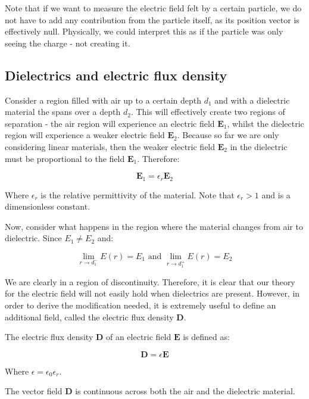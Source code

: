 \documentclass{article}
\begin{document}
Note that if we want to measure the electric field felt by a certain particle, we do not have to add any contribution from the particle itself, as its position vector is effectively null. Physically, we could interpret this as if the particle was only seeing the charge - not creating it.

\newpage

\subsection{Dielectrics and electric flux density}

Consider a region filled with air up to a certain depth $d_1$ and with a dielectric material the spans over a depth $d_2$. This will effectively create two regions of separation - the air region will experience an electric field $\mathbf{E}_1$, whilst the dielectric region will experience a weaker electric field $\mathbf{E}_2$. Because so far we are only considering linear materials, then the weaker electric field $\mathbf{E}_2$ in the dielectric must be proportional to the field $\mathbf{E}_1$. Therefore:

\[ \mathbf{E}_1 = \epsilon_r\mathbf{E}_2 \]

Where $\epsilon_r$ is the relative permittivity of the material. Note that $\epsilon_r > 1$ and is a dimensionless constant.

Now, consider what happens in the region where the material changes from air to dielectric. Since $E_1 \neq E_2$ and:

\[ \lim_{r \to d_1^{-}} E(r) = E_1 \text{   and   } \lim_{r \to d_1^{+}} E(r) = E_2 \]

We are clearly in a region of discontinuity. Therefore, it is clear that our theory for the electric field will not easily hold when dielectrics are present. However, in order to derive the modification needed, it is extremely useful to define an additional field, called the electric flux density $\mathbf{D}$.

\begin{definition}
    The electric flux density $\mathbf{D}$ of an electric field $\mathbf{E}$ is defined as:

    \[ \mathbf{D} = \epsilon\mathbf{E} \]

    Where $\epsilon = \epsilon_0\epsilon_r$.
\end{definition}

\begin{proposition}
    The vector field $\mathbf{D}$ is continuous across both the air and the dielectric material.
\end{proposition}
\end{document}
